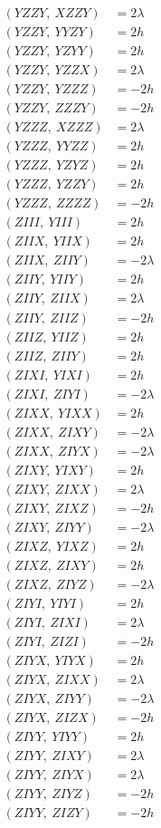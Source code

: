 \documentclass{article}
\begin{document}
\begin{align*}
  (YZZY,\ XZZY) &= 2 \lambda \\
  (YZZY,\ YYZY) &= 2 h \\
  (YZZY,\ YZYY) &= 2 h \\
  (YZZY,\ YZZX) &= 2 \lambda \\
  (YZZY,\ YZZZ) &= - 2 h \\
  (YZZY,\ ZZZY) &= - 2 h \\
  (YZZZ,\ XZZZ) &= 2 \lambda \\
  (YZZZ,\ YYZZ) &= 2 h \\
  (YZZZ,\ YZYZ) &= 2 h \\
  (YZZZ,\ YZZY) &= 2 h \\
  (YZZZ,\ ZZZZ) &= - 2 h \\
  (ZIII,\ YIII) &= 2 h \\
  (ZIIX,\ YIIX) &= 2 h \\
  (ZIIX,\ ZIIY) &= - 2 \lambda \\
  (ZIIY,\ YIIY) &= 2 h \\
  (ZIIY,\ ZIIX) &= 2 \lambda \\
  (ZIIY,\ ZIIZ) &= - 2 h \\
  (ZIIZ,\ YIIZ) &= 2 h \\
  (ZIIZ,\ ZIIY) &= 2 h \\
  (ZIXI,\ YIXI) &= 2 h \\
  (ZIXI,\ ZIYI) &= - 2 \lambda \\
  (ZIXX,\ YIXX) &= 2 h \\
  (ZIXX,\ ZIXY) &= - 2 \lambda \\
  (ZIXX,\ ZIYX) &= - 2 \lambda \\
  (ZIXY,\ YIXY) &= 2 h \\
  (ZIXY,\ ZIXX) &= 2 \lambda \\
  (ZIXY,\ ZIXZ) &= - 2 h \\
  (ZIXY,\ ZIYY) &= - 2 \lambda \\
  (ZIXZ,\ YIXZ) &= 2 h \\
  (ZIXZ,\ ZIXY) &= 2 h \\
  (ZIXZ,\ ZIYZ) &= - 2 \lambda \\
  (ZIYI,\ YIYI) &= 2 h \\
  (ZIYI,\ ZIXI) &= 2 \lambda \\
  (ZIYI,\ ZIZI) &= - 2 h \\
  (ZIYX,\ YIYX) &= 2 h \\
  (ZIYX,\ ZIXX) &= 2 \lambda \\
  (ZIYX,\ ZIYY) &= - 2 \lambda \\
  (ZIYX,\ ZIZX) &= - 2 h \\
  (ZIYY,\ YIYY) &= 2 h \\
  (ZIYY,\ ZIXY) &= 2 \lambda \\
  (ZIYY,\ ZIYX) &= 2 \lambda \\
  (ZIYY,\ ZIYZ) &= - 2 h \\
  (ZIYY,\ ZIZY) &= - 2 h
\end{align*}
\end{document}
